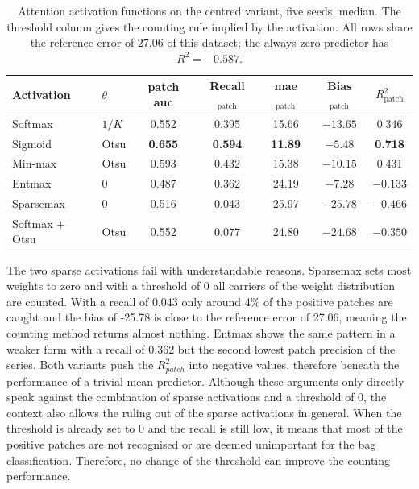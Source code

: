 \documentclass[12pt,parskip = half, DIV=classic,listof=totoc]{scrartcl}
\begin{document}
			\begin{table}[htbp]
					\centering
					\begin{tabular}{@{}llccccc@{}}
						\toprule
						Activation & $\theta$ & patch \acs*{auc} & Recall$_{\text{patch}}$
							& \acs*{mae}$_{\text{patch}}$ & Bias$_{\text{patch}}$ & $R^2_{\text{patch}}$ \\
						\midrule
						Softmax    & $1/K$ & 0.552 & 0.395 & 15.66 & $-13.65$ & 0.346 \\
						Sigmoid    & Otsu  & \textbf{0.655} & \textbf{0.594} & \textbf{11.89} & $-5.48$ & \textbf{0.718} \\
						Min-max    & Otsu  & 0.593 & 0.432 & 15.38 & $-10.15$ & 0.431 \\
						Entmax     & $0$   & 0.487 & 0.362 & 24.19 & $-7.28$ & $-0.133$ \\
						Sparsemax  & $0$   & 0.516 & 0.043 & 25.97 & $-25.78$ & $-0.466$ \\
						Softmax + Otsu & Otsu & 0.552 & 0.077 & 24.80 & $-24.68$ & $-0.350$ \\
						\bottomrule
					\end{tabular}
					\caption[Attention activation functions on the centred variant, five seeds, median]{Attention activation functions on the centred variant, five seeds, median.
					The threshold column gives the counting rule implied by the activation. All
					rows share the reference error of $27.06$ of this dataset; the always-zero predictor has $R^2 = -0.587$.}
					\label{tab:gwhd_activations}
			\end{table}
			The two sparse activations fail with understandable reasons. Sparsemax sets most weights to zero and with a threshold of 0
			all carriers of the weight distribution are counted. With a recall of 0.043 only around 4\% of the positive patches are caught and 
			the bias of -25.78 is close to the reference error of 27.06, meaning the counting method returns almost nothing. Entmax
			shows the same pattern in a weaker form with a recall of 0.362 but the second lowest patch precision of the series. Both variants 
			push the $R^2_{patch}$ into negative values, therefore beneath the performance of a trivial mean predictor. 
			Although these arguments only directly speak against the combination of sparse activations and a threshold of 0, the 
			context also allows the ruling out of the sparse activations in general. When the threshold is already set to 0 and the recall is still low,
			it means that most of the positive patches are not recognised or are deemed unimportant for the bag classification. Therefore, 
			no change of the threshold can improve the counting performance. 
\end{document}
